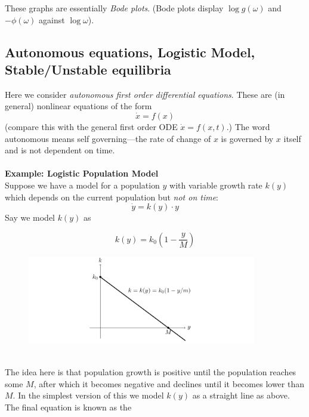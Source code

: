 \documentclass{report}
\begin{document}
These graphs are essentially \textit{Bode plots}. (Bode plots display $\log g(\omega)$ and $-\phi(\omega)$ against 
$\log\omega$).
\newpage

\subsection{Autonomous equations, Logistic Model,\\Stable/Unstable equilibria}
Here we consider \textit{autonomous first order differential equations}. These are (in general) nonlinear equations
of the form
\begin{equation*}
\dot{x}=f(x)
\end{equation*}
(compare this with the general first order ODE $\dot{x}=f(x,t)$.) The word autonomous means self governing---the
rate of change of $x$ is governed by $x$ itself and is not dependent on time.\\
\vspace{1mm}\\
\textbf{Example: Logistic Population Model}\\
Suppose we have a model for a population $y$ with variable growth rate $k(y)$ which depends on the current
population but \textit{not on time}:
\begin{equation*}
\dot{y}=k(y)\cdot y
\end{equation*}
Say we model $k(y)$ as
\begin{figure}[h]
\begin{equation*}
k(y)=k_0\left(1-\frac{y}{M}\right)
\end{equation*}
\begin{center}
\includegraphics[width=10cm]{13}\\
\end{center}
\end{figure}\\
The idea here is that population growth is positive until the population reaches some $M$, after which it becomes 
negative and declines until it becomes lower than $M$.
In the simplest version of this we model $k(y)$ as a straight line as above. The final equation is known as the 
\end{document}
